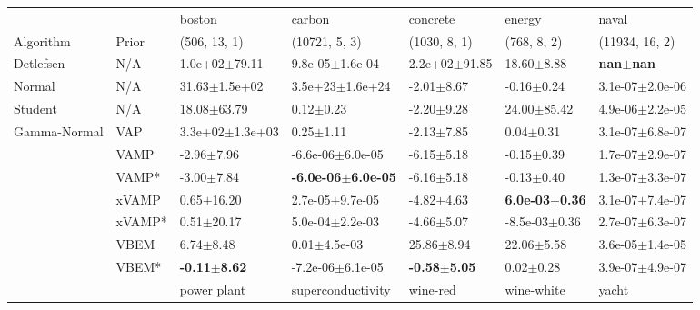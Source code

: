 \begin{tabular}{lllllll}
\toprule
             &       &                   boston &                         carbon &                 concrete &                     energy &                 naval \\
Algorithm & Prior& (506, 13, 1)& (10721, 5, 3)& (1030, 8, 1)& (768, 8, 2)& (11934, 16, 2)\\
\midrule
Detlefsen & N/A &        1.0e+02$\pm$79.11 &            9.8e-05$\pm$1.6e-04 &        2.2e+02$\pm$91.85 &             18.60$\pm$8.88 &  \textbf{nan$\pm$nan} \\
Normal & N/A &        31.63$\pm$1.5e+02 &            3.5e+23$\pm$1.6e+24 &           -2.01$\pm$8.67 &             -0.16$\pm$0.24 &   3.1e-07$\pm$2.0e-06 \\
Student & N/A &          18.08$\pm$63.79 &                  0.12$\pm$0.23 &           -2.20$\pm$9.28 &            24.00$\pm$85.42 &   4.9e-06$\pm$2.2e-05 \\
Gamma-Normal & VAP &      3.3e+02$\pm$1.3e+03 &                  0.25$\pm$1.11 &           -2.13$\pm$7.85 &              0.04$\pm$0.31 &   3.1e-07$\pm$6.8e-07 \\
             & VAMP &           -2.96$\pm$7.96 &           -6.6e-06$\pm$6.0e-05 &           -6.15$\pm$5.18 &             -0.15$\pm$0.39 &   1.7e-07$\pm$2.9e-07 \\
             & VAMP* &           -3.00$\pm$7.84 &  \textbf{-6.0e-06$\pm$6.0e-05} &           -6.16$\pm$5.18 &             -0.13$\pm$0.40 &   1.3e-07$\pm$3.3e-07 \\
             & xVAMP &           0.65$\pm$16.20 &            2.7e-05$\pm$9.7e-05 &           -4.82$\pm$4.63 &  \textbf{6.0e-03$\pm$0.36} &   3.1e-07$\pm$7.4e-07 \\
             & xVAMP* &           0.51$\pm$20.17 &            5.0e-04$\pm$2.2e-03 &           -4.66$\pm$5.07 &          -8.5e-03$\pm$0.36 &   2.7e-07$\pm$6.3e-07 \\
             & VBEM &            6.74$\pm$8.48 &               0.01$\pm$4.5e-03 &           25.86$\pm$8.94 &             22.06$\pm$5.58 &   3.6e-05$\pm$1.4e-05 \\
             & VBEM* &  \textbf{-0.11$\pm$8.62} &           -7.2e-06$\pm$6.1e-05 &  \textbf{-0.58$\pm$5.05} &              0.02$\pm$0.28 &   3.9e-07$\pm$4.9e-07 \\
\midrule
             &       &             power plant &        superconductivity &                   wine-red &                  wine-white &                     yacht \\

\end{tabular}
